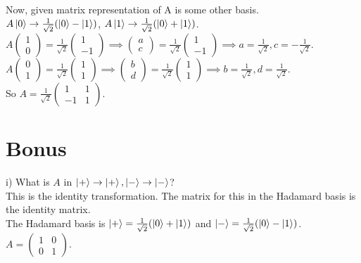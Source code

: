 \documentclass{article}
\newcommand{\0}{{$|0\rangle$}}
\newcommand{\1}{{$|1\rangle$}}
\begin{document}
Now, given matrix representation of A is some other basis. \\
$A \ket{0} \to \frac{1}{\sqrt{2}}(\ket{0} - \ket{1})$, $A \ket{1} \to \frac{1}{\sqrt{2}}(\ket{0} + \ket{1})$. \\
$A\begin{pmatrix} 1 \\ 0 \end{pmatrix} = \frac{1}{\sqrt{2}}\begin{pmatrix} 1 \\ -1 \end{pmatrix} \implies \begin{pmatrix} a \\ c \end{pmatrix} = \frac{1}{\sqrt{2}}\begin{pmatrix} 1 \\ -1 \end{pmatrix} \implies a = \frac{1}{\sqrt{2}}, c = -\frac{1}{\sqrt{2}}$. \\
$A\begin{pmatrix} 0 \\ 1 \end{pmatrix} = \frac{1}{\sqrt{2}}\begin{pmatrix} 1 \\ 1 \end{pmatrix} \implies \begin{pmatrix} b \\ d \end{pmatrix} = \frac{1}{\sqrt{2}}\begin{pmatrix} 1 \\ 1 \end{pmatrix} \implies b = \frac{1}{\sqrt{2}}, d = \frac{1}{\sqrt{2}}$. \\
So $A = \frac{1}{\sqrt{2}} \begin{pmatrix} 1 & 1 \\ -1 & 1 \end{pmatrix}$.


\section*{Bonus}

i) What is $A$ in $\ket{+} \to \ket{+}, \ket{-} \to \ket{-}$? \\
This is the identity transformation. The matrix for this in the Hadamard basis is the identity matrix. \\
The Hadamard basis is $\ket{+} = \frac{1}{\sqrt{2}}(\ket{0}+\ket{1})$ and $\ket{-} = \frac{1}{\sqrt{2}}(\ket{0}-\ket{1})$. \\
$A = \begin{pmatrix} 1 & 0 \\ 0 & 1 \end{pmatrix}$.
\end{document}
